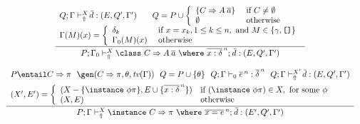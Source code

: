 \begin{figure}
\[ \begin{array}{cc}
	\displaystyle\frac
	 {\begin{array}{ll}
            Q;\Gamma \vdash_{\Uparrow}^X \overline{\!d} : (E, Q', \Gamma') \:\: & \:\:
            Q = P \cup \left\{ \begin{array}{ll}
                                  \{ C \Rightarrow A\:\overline{a} \} & \text{ if } C \not= \emptyset \\
                                  \emptyset                              & \text{ otherwise}
                                \end{array}\right. \\
            \multicolumn{2}{c}{
                \Gamma(M)(x) = \left\{ \begin{array}{ll}
                                 \delta_k       & \text{ if } x = x_k, 1 \leq k \leq n, \text{ and } 
                                                              M \in \{ \gamma, \texttt{[]} \}\\
                                 \Gamma_0(M)(x) & \text{ otherwise} 
                               \end{array}\right. }
          \end{array}}
	 {P;\Gamma_0 \vdash_{\Uparrow}^X \class\ C \Rightarrow A\: \overline{a}\ \where\ \overline{x:\delta}^{\,n};\: \overline{\!d} : 
            (E, Q', \Gamma') } \\ \\

	\displaystyle\frac
	 {\begin{array}{l}
               P \entail C \Rightarrow \pi \:\:\:
               \gen(C\Rightarrow \pi, \theta, \tv(\Gamma)) \:\:\:
               Q = P \cup \{ \theta \} \:\:\:
               Q;\Gamma \vdash_0 \overline{e}^{\,n} : \overline{\delta}^{\,n} \:\:\:
               Q;\Gamma \vdash_{\Uparrow}^{X'} \overline{\!d} : (E,Q',\Gamma') \\[.2cm]
               (X',E') = \left\{ \begin{array}{ll}
                               (X - \{ \instance\ \phi\pi \}, E \cup \{ \overline{x : \delta}^{\,n} \}) 
                                   & \text{if } (\instance\ \phi\pi) \in X, \text{ for some } \phi\\
                               (X, E) & \text{otherwise} 
                             \end{array}\right.
          \end{array}}
	 {P;\Gamma \vdash_{\Uparrow}^X \instance\ C \Rightarrow \pi\ \where\ \overline{x = e}^{\,n};\: \overline{\!d}
             : (E',Q',\Gamma')}\\ \\


\end{array}\]
\end{figure}

